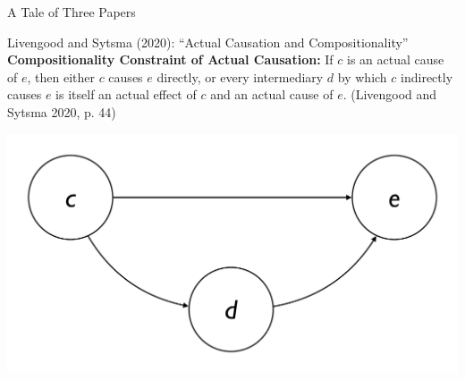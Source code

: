 \documentclass[xcolor=table,9pt,aspectratio=169]{beamer}
\begin{document}
\begin{frame}{\vspace*{10mm}A Tale of Three Papers}
\begin{multicols}{3}
\begin{center}
\end{center}
\end{multicols}
\end{frame}


\begin{frame}{\vspace*{10mm}Livengood and Sytsma (2020): ``Actual Causation and Compositionality''}
\vspace*{-5mm}
\textbf{Compositionality Constraint of Actual Causation:} If $c$ is an actual cause of $e$, then either $c$ causes $e$ directly, or every intermediary $d$ by which $c$ indirectly causes $e$ is itself an actual effect of $c$ and an actual cause of $e$. (Livengood and Sytsma 2020, p. 44)
\begin{center}
   \includegraphics[width=0.5\linewidth]{figures/constraint.pdf}
\end{center}
\end{frame}
\end{document}
